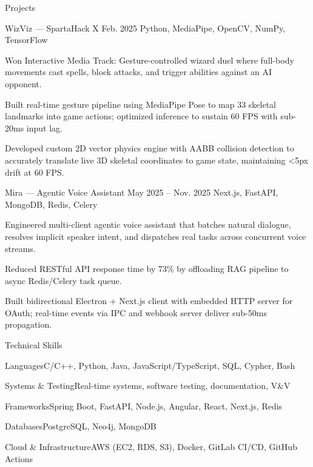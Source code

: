 \documentclass[
	11pt
]{../../../resume}
\begin{document}
	\begin{rSection}{P}{rojects}
		\begin{rSectionEntry}
			{WizViz --- SpartaHack X}
			{Feb. 2025}
			{}
			{Python, MediaPipe, OpenCV, NumPy, TensorFlow}
			{}

			\item Won Interactive Media Track: Gesture-controlled wizard duel where full-body movements cast spells, block attacks, and trigger abilities against an AI opponent.
			\item Built real-time gesture pipeline using MediaPipe Pose to map 33 skeletal landmarks into game actions; optimized inference to sustain 60 FPS with sub-20ms input lag.
			\item Developed custom 2D vector physics engine with AABB collision detection to accurately translate live 3D skeletal coordinates to game state, maintaining \textless5px drift at 60 FPS.
		\end{rSectionEntry}

		\begin{rSectionEntry}
			{Mira --- Agentic Voice Assistant}
			{May 2025 -- Nov. 2025}
			{}
			{Next.js, FastAPI, MongoDB, Redis, Celery}
			{}

			\item Engineered multi-client agentic voice assistant that batches natural dialogue, resolves implicit speaker intent, and dispatches real tasks across concurrent voice streams.
			\item Reduced RESTful API response time by 73\% by offloading RAG pipeline to async Redis/Celery task queue.
			\item Built bidirectional Electron + Next.js client with embedded HTTP server for OAuth; real-time events via IPC and webhook server deliver sub-50ms propagation.
		\end{rSectionEntry}
	\end{rSection}

	\begin{rSection}{T}{echnical Skills}
		\begin{rSet}{Languages}{C/C++, Python, Java, JavaScript/TypeScript, SQL, Cypher, Bash}
		\end{rSet}
		\begin{rSet}{Systems \& Testing}{Real-time systems, software testing, documentation, V\&V}
		\end{rSet}
		\begin{rSet}{Frameworks}{Spring Boot, FastAPI, Node.js, Angular, React, Next.js, Redis}
		\end{rSet}
		\begin{rSet}{Databases}{PostgreSQL, Neo4j, MongoDB}
		\end{rSet}
		\begin{rSet}{Cloud \& Infrastructure}{AWS (EC2, RDS, S3), Docker, GitLab CI/CD, GitHub Actions}
		\end{rSet}
	\end{rSection}
\end{document}
